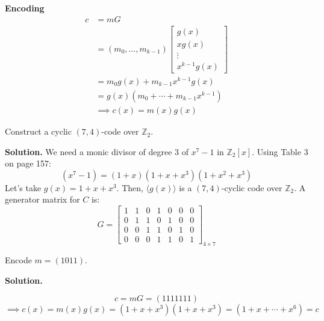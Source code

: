 \textbf{Encoding}
\begin{align*}
    c
     & =mG                                \\
     & =(m_0,\ldots,m_{k-1})
    \begin{bmatrix}
        g(x)   \\
        xg(x)  \\
        \vdots \\
        x^{k-1}g(x)
    \end{bmatrix}             \\
     & =m_0g(x)+m_{k-1}x^{k-1}g(x)        \\
     & =g(x)(m_0+\cdots + m_{k-1}x^{k-1}) \\
     & \implies c(x)=m(x)g(x)
\end{align*}

\begin{exbox}
    \begin{example}
        Construct a cyclic $ (7,4) $-code over $ \mathbb{Z}_2 $.

        \textbf{Solution.} We need a monic divisor
        of degree $ 3 $ of $ x^7-1 $ in $ \mathbb{Z}_2[x] $. Using
        Table 3 on page 157:
        \[ (x^7-1)=(1+x)(1+x+x^3)(1+x^2+x^3) \]
        Let's take $ g(x)=1+x+x^3 $. Then, $ \langle g(x)\rangle $ is a
        $ (7,4) $-cyclic code over $ \mathbb{Z}_2 $. A generator matrix
        for $ C $ is:
        \[ G=
            \begin{bmatrix}
                1 & 1 & 0 & 1 & 0 & 0 & 0 \\
                0 & 1 & 1 & 0 & 1 & 0 & 0 \\
                0 & 0 & 1 & 1 & 0 & 1 & 0 \\
                0 & 0 & 0 & 1 & 1 & 0 & 1
            \end{bmatrix}_{4\times 7} \]

        Encode $ m=(1011) $.

        \textbf{Solution.}

        \[ c=mG=(1111111) \]
        \[ \implies c(x)=m(x)g(x)=(1+x+x^3)(1+x+x^3)=(1+x+\cdots+x^6)=c \]
    \end{example}
\end{exbox}
